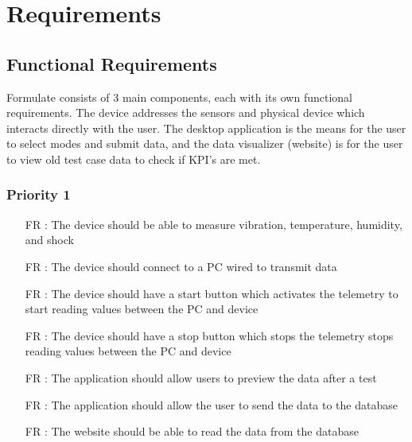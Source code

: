 \documentclass[12pt]{article}
\newcounter{reqnum} %
\begin{document}
  \newpage

\section{Requirements}

\subsection{Functional Requirements}
Formulate consists of 3 main components, each with its own functional requirements. The device addresses the sensors and physical device which interacts directly with the user. The desktop application is the means for the user to select modes and submit data, and the data visualizer (website) is for the user to view old test case data to check if KPI's are met.



\subsubsection{Priority 1} 

\begin{itemize}
  
  \item[FR \refstepcounter{reqnum}\thereqnum:] The device should be able to measure vibration, temperature, humidity, and shock
  
  \item[FR \refstepcounter{reqnum}\thereqnum:] The device should connect to a PC wired to transmit data
  
  \item[FR \refstepcounter{reqnum}\thereqnum:] The device should have a start button which activates the telemetry to start reading values between the PC and device 
  
  \item[FR \refstepcounter{reqnum}\thereqnum:] The device should have a stop button which stops the telemetry stops reading values between the PC and device
  
  \item[FR \refstepcounter{reqnum}\thereqnum:] The application should allow users to preview the data after a test

  \item[FR \refstepcounter{reqnum}\thereqnum:] The application should allow the user to send the data to the database
  
  \item[FR \refstepcounter{reqnum}\thereqnum:] The website should be able to read the data from the database
  
  \end{itemize}
\end{document}
